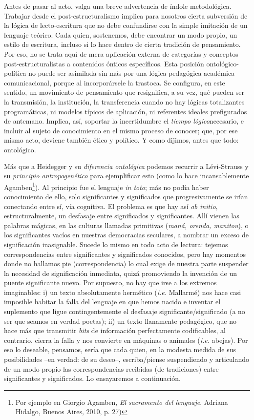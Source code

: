 \documentclass{book}
\begin{document}
Antes de pasar al acto, valga una breve advertencia de índole
metodológica. Trabajar desde el post-estructuralismo implica para
nosotros cierta subversión de la lógica de lecto-escritura que no debe
confundirse con la simple imitación de un lenguaje teórico. Cada quien,
sostenemos, debe encontrar un modo propio, un estilo de escritura,
incluso si lo hace dentro de cierta tradición de pensamiento. Por eso,
no se trata aquí de mera aplicación externa de categorías y conceptos
post-estructuralistas a contenidos ónticos específicos. Esta posición
ontológico-política no puede ser asimilada sin más por una lógica
pedagógica-académica-comunicacional, porque al incorporársele la
trastoca. Se configura, en este sentido, un movimiento de pensamiento
que resignifica, a su vez, qué pueden ser la transmisión, la
institución, la transferencia cuando no hay lógicas totalizantes
programáticas, ni modelos típicos de aplicación, ni referentes ideales
prefigurados de antemano. Implica, así, soportar la incertidumbre el
\emph{tiempo lógico}necesario, e incluir al sujeto de conocimiento en el
mismo proceso de conocer; que, por ese mismo acto, deviene también ético
y político. Y como dijimos, antes que todo: ontológico.

Más que a Heidegger y su \emph{diferencia ontológica} podemos recurrir a
Lévi-Strauss y su \emph{principio antropogenético} para ejemplificar
esto (como lo hace incansablemente Agamben\footnote{Por ejemplo en
  Giorgio Agamben, \emph{El sacramento del lenguaje}, Adriana Hidalgo,
  Buenos Aires, 2010, p. 27)}). Al principio fue el lenguaje \emph{in
toto}; más no podía haber conocimiento de ello, solo significantes y
significados que progresivamente se irían conectando entre sí, vía
cognitiva. El problema es que hay así \emph{ab initio},
estructuralmente, un desfasaje entre significados y significantes. Allí
vienen las palabras mágicas, en las culturas llamadas primitivas
(\emph{maná, orenda, manitou}), o los significantes vacíos en nuestras
democracias seculares, a nombrar un exceso de significación inasignable.
Sucede lo mismo en todo acto de lectura: tejemos correspondencias entre
significantes y significados conocidos, pero hay momentos donde no
hallamos pie (correspondencia) lo cual exige de nuestra parte suspender
la necesidad de significación inmediata, quizá promoviendo la invención
de un puente significante nuevo. Por supuesto, no hay que irse a los
extremos imaginables: i) un texto absolutamente hermético (\emph{i.e.}
Mallarmé) nos hace casi imposible habitar la falla del lenguaje en que
hemos nacido e inventar el suplemento que ligue contingentemente el
desfasaje significante/significado (a no ser que seamos en verdad
poetas); ii) un texto llanamente pedagógico, que no hace más que
transmitir \emph{bits} de información perfectamente codificables, al
contrario, cierra la falla y nos convierte en máquinas o animales
(\emph{i.e.} abejas). Por eso lo deseable, pensamos, sería que cada
quien, en la modesta medida de sus posibilidades --en verdad: de su
deseo--, escriba/piense suspendiendo y articulando de un modo propio las
correspondencias recibidas (de tradiciones) entre significantes y
significados. Lo ensayaremos a continuación.
\end{document}
